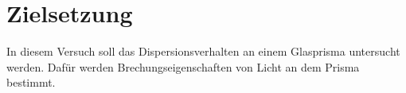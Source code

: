 \section{Zielsetzung}

\label{sec:Zielsetzung}
In diesem Versuch soll das Dispersionsverhalten  an einem Glasprisma untersucht werden. Dafür werden
Brechungseigenschaften von Licht an dem Prisma bestimmt.

